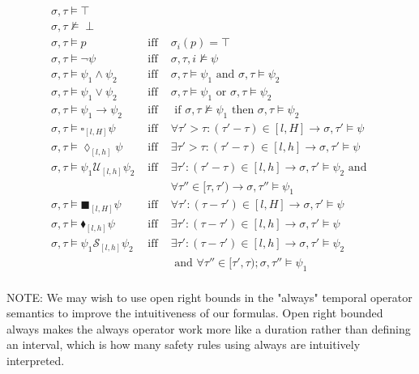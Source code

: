 \documentclass[10pt,a4paper]{article}
\begin{document}
\begin{align*}
\sigma, \tau \vDash \top & &\\
\sigma, \tau \nvDash \perp & &\\
\sigma, \tau \vDash p & \text{ iff } & \sigma_i(p) = \top \\
\sigma, \tau \vDash \neg \psi & \text{ iff } & \sigma, \tau, i \nvDash \psi \\
\sigma, \tau \vDash \psi_1 \wedge \psi_2 & \text{ iff } & \sigma, \tau \vDash \psi_1 \text{ and } \sigma, \tau \vDash \psi_2 \\
\sigma, \tau \vDash \psi_1 \vee \psi_2 & \text{ iff } & \sigma, \tau \vDash \psi_1 \text{ or } \sigma, \tau \vDash \psi_2 \\
\sigma, \tau \vDash \psi_1 \rightarrow \psi_2 & \text{ iff } & \text{ if } \sigma,\tau \nvDash \psi_1 \text{ then } \sigma,\tau \vDash \psi_2 \\
\sigma,\tau \vDash \square_{[l,H]} \psi & \text{ iff } & \forall \tau' > \tau: (\tau'-\tau) \in [l,H] \rightarrow \sigma, \tau' \vDash \psi \\
\sigma,\tau \vDash \lozenge_{[l,h]} \psi & \text{ iff } & \exists \tau' > \tau: (\tau' - \tau) \in [l,h] \rightarrow \sigma, \tau' \vDash \psi \\
\sigma, \tau \vDash \psi_1 \mathcal{U}_{[l,h]} \psi_2 & \text{ iff } & \exists \tau': (\tau' - \tau) \in [l,h] \rightarrow \sigma, \tau' \vDash \psi_2 \text{ and } \\ & & \forall \tau'' \in [\tau,\tau') \rightarrow \sigma, \tau'' \vDash \psi_1 \\
%
\sigma,\tau \vDash \blacksquare_{[l,H]} \psi & \text{ iff } & \forall \tau': (\tau - \tau') \in [l,H] \rightarrow \sigma,\tau' \vDash \psi \\
\sigma, \tau \vDash \blacklozenge_{[l,h]} \psi & \text{ iff } & \exists \tau': (\tau - \tau') \in [l,h] \rightarrow \sigma, \tau' \vDash \psi \\
%
\sigma,\tau \vDash \psi_1 \mathcal{S}_{[l,h]} \psi_2 & \text{ iff } & \exists \tau':  (\tau - \tau') \in [l,h] \rightarrow \sigma, \tau' \vDash \psi_2 \\
& & \text{ and } \forall \tau'' \in [\tau',\tau); \sigma, \tau'' \vDash \psi_1 \\
\end{align*}

NOTE: We may wish to use open right bounds in the "always" temporal operator semantics to improve the intuitiveness of our formulas. Open right bounded always makes the always operator work more like a duration rather than defining an interval, which is how many safety rules using always are intuitively interpreted.
\end{document}
